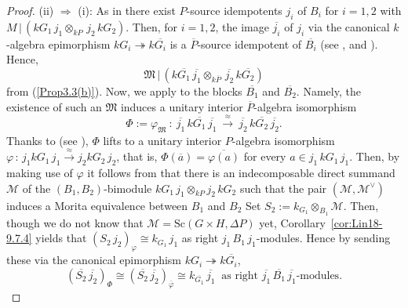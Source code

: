 \documentclass[12pt,a4paper]{amsart}
\theoremstyle{plain}\newtheorem{Theorem}{Theorem}[section]
\theoremstyle{plain}\newtheorem{Conjecture}[Theorem]{Conjecture}
\theoremstyle{plain}\newtheorem{Corollary}[Theorem]{Corollary}
\theoremstyle{plain}\newtheorem{Lemma}[Theorem]{Lemma}
\theoremstyle{plain}\newtheorem{Proposition}[Theorem]{Proposition}
\theoremstyle{definition}\newtheorem{Definition}[Theorem]{Definition}
\theoremstyle{definition}\newtheorem{Example}[Theorem]{Example}
\theoremstyle{definition}\newtheorem{Examples}[Theorem]{Examples}
\theoremstyle{definition}\newtheorem{Remark}[Theorem]{Remark}
\theoremstyle{definition}\newtheorem{Question}[Theorem]{Question}
\theoremstyle{definition}\newtheorem{Notation}[Theorem]{Notation}
\theoremstyle{definition}\newtheorem{Hypothesis}[Theorem]{Hypothesis}
\theoremstyle{definition}\newtheorem{Assumption}[Theorem]{Assumption}
\theoremstyle{definition}\newtheorem{Strategy}[Theorem]{Strategy}
\theoremstyle{definition}\newtheorem{Contents}[Theorem]{Contents}
\theoremstyle{definition}\newtheorem{Computations}[Theorem]{Computations}
\theoremstyle{definition}\newtheorem{Equivalences}[Theorem]{Equivalences}
\theoremstyle{definition}\newtheorem{Notation/Definition}[Theorem]{Notation/Definition}
\theoremstyle{definition}\newtheorem{noth}[Theorem]{}
\theoremstyle{plain}\newtheorem{Step}[Theorem]{Step}
\newcommand{\Sc}{{\text{Sc}}}
\begin{document}
\begin{proof}
\noindent (ii) $\Rightarrow$ (i):
As in \cite[p.822]{Lin01}
there exist $P$-source idempotents $j_i$ of $B_i$ for $i=1,2$ with
$M\,|\, (kG_1\,j_1\otimes_{kP}\,j_2\,kG_2)$.
Then, for $i=1,2$,  the image $\overline{j_i}$ of $j_i$
via the canonical $k$-algebra epimorphism $kG_i\twoheadrightarrow k\overline{G_i}$ is a  
$\overline P$-source idempotent of $\overline{B_i}$ 
(see \cite[Chap.5 Theorem 8.11]{NT89}, \cite[\S 3]{KP90} and \cite[Lemma~4.1]{Kaw03}).
%
%
Hence,
\begin{equation}\label{ScottForOvelineG}
\mathfrak M\,|\, (k\overline{G_1}\,\overline{j_1}\otimes_{k\overline P}\,\overline{j_2}\,k\overline{G_2})
\end{equation}
from (\ref{Prop3.3(b)}).
%
Now, we apply \cite[(i) $\Rightarrow$ (ii) in Theorem~9.7.4]{Lin18} to the blocks $\overline{B_1}$ and
$\overline{B_2}$.
Namely, the existence of such an $\mathfrak M$ induces 
a unitary interior $\overline P$-algebra isomorphism 
$$\Phi:=\varphi_{\mathfrak M}\ : \  \overline{j_1}\,k\overline{G_1}\,\overline{j_1}\ 
\overset{\approx}{\rightarrow}\ \overline{j_2}\,k\overline{G_2}\,\overline{j_2}.$$
Thanks to \cite[Corollary 1.12]{Pui01} (see \cite{Kue01}), $\Phi$ lifts to a unitary interior
$P$-algebra isomorphism $\varphi\,:\, j_1 kG_1\,j_1 \overset{\approx}{\rightarrow} j_2 kG_2\,j_2$,
that is, $\Phi(\overline a)=\overline{\varphi(a)}$ for every $a\in j_1\,kG_1\,j_1$.
Then, by making use of $\varphi$ it follows from \cite[(ii) $\Rightarrow$ (i) in Theorem 9.7.4]{Lin18}
that there is an indecomposable direct summand $\mathcal M$ of the
$(B_1,B_2)$-bimodule $kG_1\,j_1\otimes_{kP}j_2\,kG_2$ such that the pair 
$(\mathcal M,{\mathcal M}^\vee)$
induces a Morita equivalence between $B_1$ and $B_2$
Set $S_2:=k_{G_1}\otimes_{B_1}\mathcal M$. 
Then, though we do not know that $\mathcal M=\Sc(G\times H,\Delta P)$ yet,
Corollary~\ref{cor:Lin18-9.7.4} yields that 
$(S_2\,j_2)_\varphi \cong k_{G_1}\,{j_1}$ as right $j_1\,B_1\,j_1$-modules.
Hence by sending these via the canonical epimorphism $kG_i\twoheadrightarrow k{\overline{G_i}}$,
\begin{equation}\label{CorA1-mathfrakM}
(\overline{S_2}\,\overline{j_2})_{\Phi} \cong
(\overline{S_2}\,\overline{j_2})_{\overline{\varphi}}
\cong k_{\overline{G_1}}\,\overline{j_1} \ 
\text{ as right }\overline{j_1}\,\overline{B_1}\,\overline{j_1}\text{-modules.}
\end{equation}


\end{proof}
\end{document}
